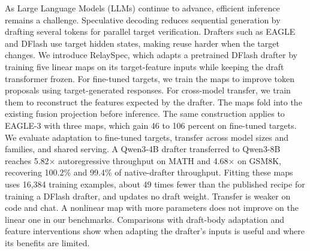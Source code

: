 As Large Language Models (LLMs) continue to advance, efficient inference remains a challenge. Speculative decoding reduces sequential generation by drafting several tokens for parallel target verification. Drafters such as EAGLE and DFlash use target hidden states, making reuse harder when the target changes. We introduce RelaySpec, which adapts a pretrained DFlash drafter by training five linear maps on its target-feature inputs while keeping the draft transformer frozen. For fine-tuned targets, we train the maps to improve token proposals using target-generated responses. For cross-model transfer, we train them to reconstruct the features expected by the drafter. The maps fold into the existing fusion projection before inference. The same construction applies to EAGLE-3 with three maps, which gain 46 to 106 percent on fine-tuned targets. We evaluate adaptation to fine-tuned targets, transfer across model sizes and families, and shared serving. A Qwen3-4B drafter transferred to Qwen3-8B reaches 5.82$\times$ autoregressive throughput on MATH and 4.68$\times$ on GSM8K, recovering 100.2\% and 99.4\% of native-drafter throughput. Fitting these maps uses 16,384 training examples, about 49 times fewer than the published recipe for training a DFlash drafter, and updates no draft weight. Transfer is weaker on code and chat. A nonlinear map with more parameters does not improve on the linear one in our benchmarks. Comparisons with draft-body adaptation and feature interventions show when adapting the drafter's inputs is useful and where its benefits are limited.
